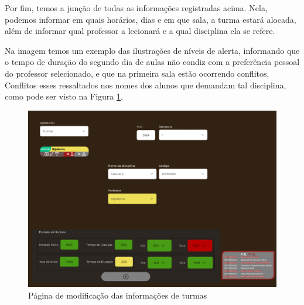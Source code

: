 Por fim, temos a junção de todas as informações registradas acima. Nela, podemos informar em quais horários, dias e em que sala, a turma estará alocada, além de informar qual professor a lecionará e a qual disciplina ela se refere.

Na imagem temos um exemplo das ilustrações de níveis de alerta, informando que o tempo de duração do segundo dia de aulas não condiz com a preferência pessoal do professor selecionado, e que na primeira sala estão ocorrendo conflitos. Conflitos esses ressaltados nos nomes dos alunos que demandam tal disciplina, como pode ser visto na Figura \ref{fig:CRUD_turmas}.

\begin{figure}[htbp]\centering
  \caption{\label{fig:CRUD_turmas} Página de modificação das informações de turmas}
  \includegraphics[scale=0.6]{files/img/Prototipo/Medio/CRUD_turmas.png}
\end{figure} %
